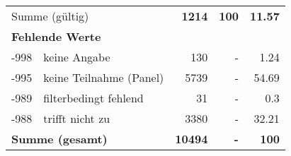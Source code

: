 \begin{longtable}{lXrrr}
     \midrule
     \multicolumn{2}{l}{Summe (gültig)} &
       \textbf{\num{1214}} &
     \textbf{100} &
       \textbf{\num[round-mode=places,round-precision=2]{11,57}} \\
     \multicolumn{5}{l}{\textbf{Fehlende Werte}}\\
       -998 &
       keine Angabe &
         \num{130} &
        - &
         \num[round-mode=places,round-precision=2]{1,24} \\
       -995 &
       keine Teilnahme (Panel) &
         \num{5739} &
        - &
         \num[round-mode=places,round-precision=2]{54,69} \\
       -989 &
       filterbedingt fehlend &
         \num{31} &
        - &
         \num[round-mode=places,round-precision=2]{0,3} \\
       -988 &
       trifft nicht zu &
         \num{3380} &
        - &
         \num[round-mode=places,round-precision=2]{32,21} \\
     \midrule
     \multicolumn{2}{l}{\textbf{Summe (gesamt)}} &
          \textbf{\num{10494}} &
        \textbf{-} &
        \textbf{100} \\
     \bottomrule
     \end{longtable}
     
